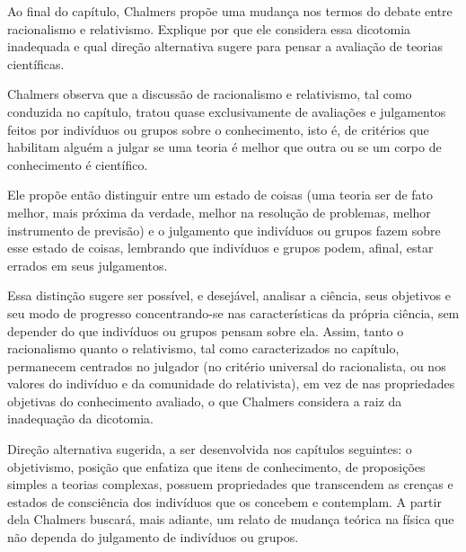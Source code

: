 \documentclass[10pt]{extarticle}
\newcommand{\resposta}[1]{\par\smallskip\noindent #1}
\begin{document}
\begin{questoes}
\item Ao final do capítulo, Chalmers propõe uma mudança nos termos do debate entre racionalismo e relativismo. Explique por que ele considera essa dicotomia inadequada e qual direção alternativa sugere para pensar a avaliação de teorias científicas.

\resposta{
\begin{topicos}
\item Chalmers observa que a discussão de racionalismo e relativismo, tal como conduzida no capítulo, tratou quase exclusivamente de avaliações e julgamentos feitos por indivíduos ou grupos sobre o conhecimento, isto é, de critérios que habilitam alguém a julgar se uma teoria é melhor que outra ou se um corpo de conhecimento é científico.
\item Ele propõe então distinguir entre um estado de coisas (uma teoria ser de fato melhor, mais próxima da verdade, melhor na resolução de problemas, melhor instrumento de previsão) e o julgamento que indivíduos ou grupos fazem sobre esse estado de coisas, lembrando que indivíduos e grupos podem, afinal, estar errados em seus julgamentos.
\item Essa distinção sugere ser possível, e desejável, analisar a ciência, seus objetivos e seu modo de progresso concentrando-se nas características da própria ciência, sem depender do que indivíduos ou grupos pensam sobre ela. Assim, tanto o racionalismo quanto o relativismo, tal como caracterizados no capítulo, permanecem centrados no julgador (no critério universal do racionalista, ou nos valores do indivíduo e da comunidade do relativista), em vez de nas propriedades objetivas do conhecimento avaliado, o que Chalmers considera a raiz da inadequação da dicotomia.
\item Direção alternativa sugerida, a ser desenvolvida nos capítulos seguintes: o objetivismo, posição que enfatiza que itens de conhecimento, de proposições simples a teorias complexas, possuem propriedades que transcendem as crenças e estados de consciência dos indivíduos que os concebem e contemplam. A partir dela Chalmers buscará, mais adiante, um relato de mudança teórica na física que não dependa do julgamento de indivíduos ou grupos.
\end{topicos}
}

\end{questoes}
\end{document}
